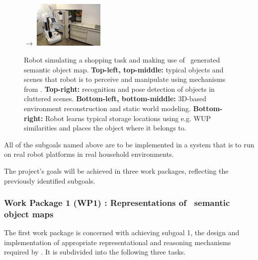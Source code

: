 \begin{figure}
\begin{centering}
    {\large$\rightarrow$}
    \includegraphics[width=0.3\textwidth]
    {figures/pr2_highdrawer.jpg}
  \end{centering}
  \caption{Robot simulating a shopping task and making use of \ksem\ generated semantic object map. \textbf{Top-left, top-middle:} 
    typical objects and scenes that robot is to perceive and manipulate using mechanisms from \ksem. 
    \textbf{Top-right:} recognition and pose detection of objects in cluttered scenes. \textbf{Bottom-left, bottom-middle:} 
  3D-based environment reconstruction and static world modeling. \textbf{Bottom-right:} Robot learns typical storage locations
using e.g. WUP similarities and places the object where it belongs to.}
  \label{fig:teaser}
\end{figure}
All of the subgoals named above are to be implemented in a system that
is to run on real robot platforms in real household environments.

The project's goals will be achieved in three work packages, reflecting
the previously identified subgoals.

\subsubsection{Work Package 1 (WP1) : Representations of \ksem\ semantic object maps}
\label{sec:wp1}
The first work package is concerned with achieving subgoal 1, the design
and implementation of appropriate representational and reasoning
mechanisms required by \ksem. It is subdivided into the following
three tasks.

